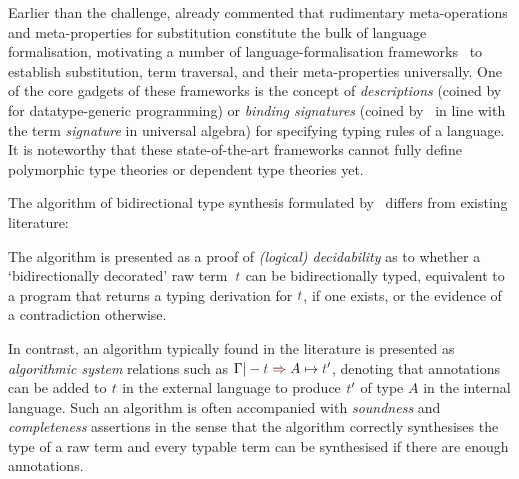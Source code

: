 Earlier than the \PoplMark challenge, \citet{Altenkirch1993} already commented that rudimentary meta-operations and meta-properties for substitution constitute the bulk of language formalisation, motivating a number of language-formalisation frameworks~\citep{Ahrens2018,Fiore2022,Gheri2020,Ahrens2022,Allais2021} to establish substitution, term traversal, and their meta-properties universally. %
One of the core gadgets of these frameworks is the concept of \emph{descriptions} (coined by~\citet{Chapman2010} for datatype-generic programming) or \emph{binding signatures} (coined by~\citet{Aczel1978} in line with the term \emph{signature} in universal algebra) for specifying typing rules of a language.
It is noteworthy that these state-of-the-art frameworks cannot fully define polymorphic type theories or dependent type theories yet.

\begin{remark}\label{re:type-synthesis-as-decidability-proof}
The algorithm of bidirectional type synthesis formulated by~\citeauthor{Wadler2022} differs from existing literature:
\begin{enumerate*}
  \item The algorithm is presented as a proof of \emph{(logical) decidability} as to whether a `bidirectionally decorated' raw term~$\isTerm{t}$ can be bidirectionally typed, equivalent to a program that returns a typing derivation for $\isTerm{t}$, if one exists, or the evidence of a contradiction otherwise.
  \item In contrast, an algorithm typically found in the literature is presented as \emph{algorithmic system} relations such as $\Gamma |- \isTerm{t} \syn A \mapsto \isTerm{t}'$, denoting that annotations can be added to $\isTerm{t}$ in the external language to produce $\isTerm{t}'$ of type $A$ in the internal language.
    Such an algorithm is often accompanied with \emph{soundness} and \emph{completeness} assertions in the sense that the algorithm correctly synthesises the type of a raw term and every typable term can be synthesised if there are enough annotations.
\end{enumerate*}
\end{remark}

